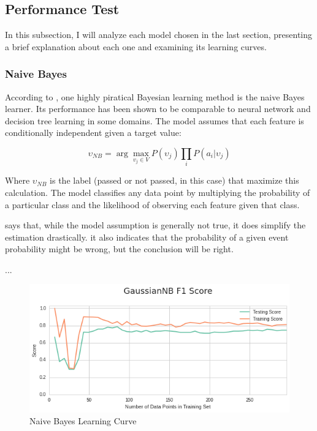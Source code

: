 \documentclass[a4paper]{article}
\begin{document}
\subsection{Performance Test}

In this subsection, I will analyze each model chosen in the last section, presenting a brief explanation about each one and examining its learning curves.

\subsubsection{Naive Bayes}
According to \cite{Mitchell}, one highly piratical Bayesian learning method is the naive Bayes learner. Its performance has been shown to be comparable to neural network and decision tree learning in some domains. The model assumes that each feature is conditionally independent given a target value:

$$\upsilon_{NB} = \arg\max_{v_j \in V}P(\upsilon_j) \prod_i P(a_i | \upsilon_j) $$

Where $\upsilon_{NB}$ is the label (passed or not passed, in this case) that maximize this calculation. The model classifies any data point by multiplying the probability of a particular class and the likelihood of observing each feature given that class.

\cite{Hastie_2009} says that, while the model assumption is generally not true, it does simplify the estimation drastically. it also indicates that the probability of a given event probability might be wrong, but the conclusion will be right.

...

\begin{figure}[ht]
\centering
\includegraphics[width=1\textwidth]{figures/guassianNB.png}
\caption{\label{fig:gaussianNB}Naive Bayes Learning Curve}
\end{figure}
\end{document}
